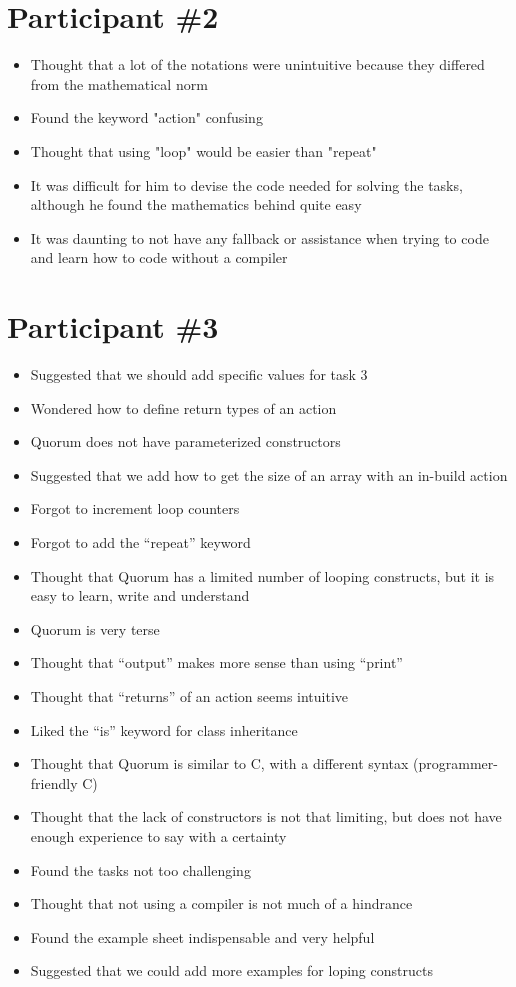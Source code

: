 \section{Participant {\#}2}
\begin{itemize}
\item Thought that a lot of the notations were unintuitive because they differed from the mathematical norm
\item Found the keyword "action" confusing 
\item Thought that using "loop" would be easier than "repeat"
\item It was difficult for him to devise the code needed for solving the tasks, although he found the mathematics behind quite easy
\item It was daunting to not have any fallback or assistance when trying to code and learn how to code without a compiler
\end{itemize}
\section{Participant {\#}3}
\begin{itemize}
\item Suggested that we should add specific values for task 3
\item Wondered how to define return types of an action
\item Quorum does not have parameterized constructors
\item Suggested that we add how to get the size of an array with an in-build action
\item Forgot to increment loop counters
\item Forgot to add the “repeat” keyword
\item Thought that Quorum has a limited number of looping constructs, but it is easy to learn, write and understand
\item Quorum is very terse
\item Thought that “output” makes more sense than using “print”
\item Thought that “returns” of an action seems intuitive
\item Liked the “is” keyword for class inheritance
\item Thought that Quorum is similar to C, with a different syntax (programmer-friendly C) 
\item Thought that the lack of constructors is not that limiting, but does not have enough experience to say with a certainty
\item Found the tasks not too challenging 
\item Thought that not using a compiler is not much of a hindrance
\item Found the example sheet indispensable and very helpful
\item Suggested that we could add more examples for loping constructs
\end{itemize}
